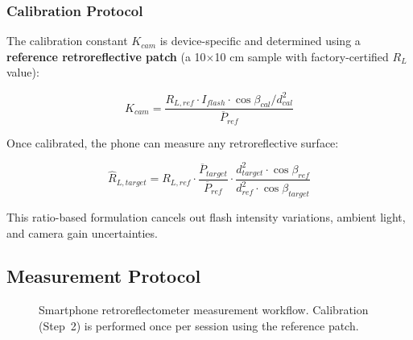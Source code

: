 \documentclass[11pt,a4paper]{article}
\begin{document}
\subsubsection{Calibration Protocol}

The calibration constant $K_{cam}$ is device-specific and determined using a \textbf{reference retroreflective patch} (a 10$\times$10 cm sample with factory-certified $R_L$ value):

\begin{equation}
K_{cam} = \frac{R_{L,ref} \cdot I_{flash} \cdot \cos\beta_{cal} / d_{cal}^2}{\overline{P}_{ref}}
\label{eq:calibration}
\end{equation}

Once calibrated, the phone can measure any retroreflective surface:

\begin{equation}
\hat{R}_{L,target} = R_{L,ref} \cdot \frac{\overline{P}_{target}}{\overline{P}_{ref}} \cdot \frac{d_{target}^2 \cdot \cos\beta_{ref}}{d_{ref}^2 \cdot \cos\beta_{target}}
\label{eq:ratio_measurement}
\end{equation}

This ratio-based formulation cancels out flash intensity variations, ambient light, and camera gain uncertainties.

\subsection{Measurement Protocol}

\begin{figure}[H]
\centering
{}
\caption{Smartphone retroreflectometer measurement workflow. Calibration (Step~2) is performed once per session using the reference patch.}
\label{fig:smartphone_workflow}
\end{figure}
\end{document}
